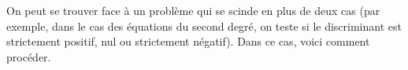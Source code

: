 On peut se trouver face à un problème qui se scinde en plus de deux cas (par exemple, dans le cas 
des équations du second degré, on teste si le discriminant est strictement positif, nul ou 
strictement négatif).
Dans ce cas, voici comment procéder.
%
%
%
%
%
%
%
%
%
%
%
